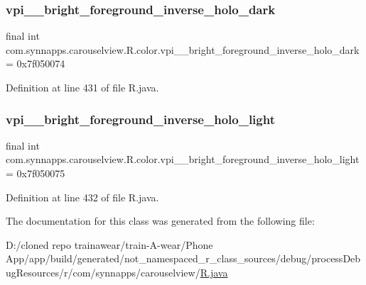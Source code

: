 \subsubsection{\texorpdfstring{vpi\_\_bright\_foreground\_inverse\_holo\_dark}{vpi\_\_bright\_foreground\_inverse\_holo\_dark}}
{\footnotesize\ttfamily final int com.\+synnapps.\+carouselview.\+R.\+color.\+vpi\+\_\+\+\_\+bright\+\_\+foreground\+\_\+inverse\+\_\+holo\+\_\+dark = 0x7f050074\hspace{0.3cm}{\ttfamily [static]}}



Definition at line 431 of file R.\+java.

\mbox{\label{classcom_1_1synnapps_1_1carouselview_1_1_r_1_1color_a94c978e237a3b2d2d1fe8c6a5e1b865d}} 
\subsubsection{\texorpdfstring{vpi\_\_bright\_foreground\_inverse\_holo\_light}{vpi\_\_bright\_foreground\_inverse\_holo\_light}}
{\footnotesize\ttfamily final int com.\+synnapps.\+carouselview.\+R.\+color.\+vpi\+\_\+\+\_\+bright\+\_\+foreground\+\_\+inverse\+\_\+holo\+\_\+light = 0x7f050075\hspace{0.3cm}{\ttfamily [static]}}



Definition at line 432 of file R.\+java.



The documentation for this class was generated from the following file\+:\begin{DoxyCompactItemize}
\item 
D\+:/cloned repo trainawear/train-\/\+A-\/wear/\+Phone App/app/build/generated/not\+\_\+namespaced\+\_\+r\+\_\+class\+\_\+sources/debug/process\+Debug\+Resources/r/com/synnapps/carouselview/\mbox{\hyperlink{process_debug_resources_2r_2com_2synnapps_2carouselview_2_r_8java}{R.\+java}}\end{DoxyCompactItemize}
